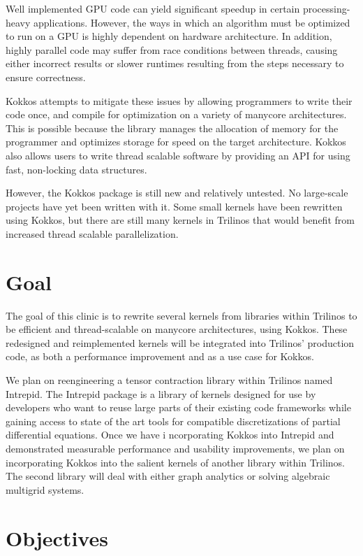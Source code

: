 \documentclass[proposal]{hmcclinic}
\begin{document}
Well implemented GPU code can yield significant speedup in certain
processing-heavy applications.  However, the ways in which an algorithm must be optimized 
to run on a GPU is highly dependent on hardware architecture.  In
addition, highly parallel code may suffer from race conditions between threads,
causing either incorrect results or slower runtimes resulting from the steps
necessary to ensure correctness.

Kokkos attempts to mitigate these issues by allowing programmers to
write their code once, and compile for optimization on a variety of
manycore architectures.  This is possible because the library manages the
allocation of memory for the programmer and optimizes storage for speed on
the target architecture. Kokkos also allows users to write thread scalable
software by providing an API for using fast, non-locking data structures. 

However, the Kokkos package is still new and relatively untested.  No
large-scale projects have yet been written with it.  Some small kernels
have been rewritten using Kokkos, but there are still many kernels in Trilinos
that would benefit from increased thread scalable parallelization. 


\section{Goal}

The goal of this clinic is to rewrite several kernels from libraries within Trilinos to be efficient
and thread-scalable on manycore architectures, using Kokkos.  These redesigned
and reimplemented kernels will be integrated into Trilinos' production code, as
both a performance improvement and as a use case for Kokkos.

We plan on reengineering a tensor contraction library within Trilinos named Intrepid. The 
Intrepid package is a library of kernels designed for use by developers who want to 
reuse large parts of their existing code frameworks while gaining access to state of the
art tools for compatible discretizations of partial differential equations. Once we have i
ncorporating Kokkos into Intrepid and demonstrated measurable performance and usability 
improvements, we plan on incorporating Kokkos into the salient kernels of another library 
within Trilinos.  The second library will deal with either graph analytics or solving algebraic multigrid systems.
\section{Objectives}
\end{document}
